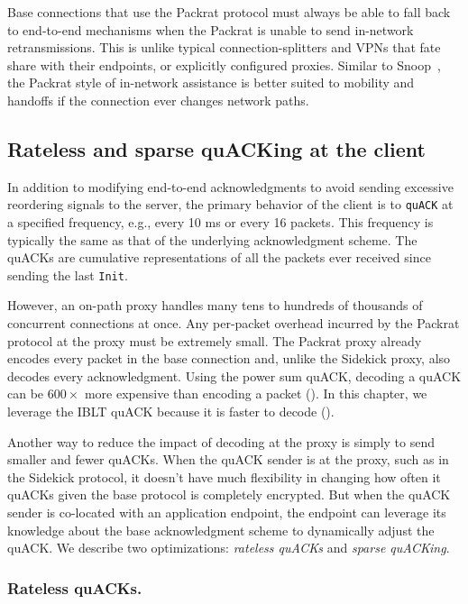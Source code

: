 Base connections that use the Packrat protocol must always be able to fall back to
end-to-end mechanisms when the Packrat is unable to send in-network
retransmissions. This is unlike typical connection-splitters and VPNs that fate
share with their endpoints, or explicitly configured proxies. Similar to
Snoop~\cite{balakrishnan1995snoop}, the Packrat style of in-network
assistance is better suited to mobility and handoffs if the connection ever
changes network paths.

\subsection{Rateless and sparse quACKing at the client}
\label{sec:packrat:design:client}

In addition to modifying end-to-end acknowledgments to avoid sending excessive
reordering signals to the server, the primary behavior of the client is
to \texttt{quACK} at a specified frequency, e.g., every 10 ms or every 16
packets. This frequency is typically the same as that of the underlying
acknowledgment scheme. The quACKs are cumulative representations of all the
packets ever received since sending the last \texttt{Init}.

However, an on-path proxy handles many tens to hundreds of thousands of
concurrent connections at once. Any per-packet overhead incurred by the Packrat
protocol at the proxy must be extremely small. The Packrat proxy already encodes
every packet in the base connection and, unlike the Sidekick proxy, also decodes
every acknowledgment. Using the power sum quACK, decoding a quACK can be
$600\!\times$ more expensive than encoding a packet
(). In this chapter, we leverage the IBLT
quACK because it is faster to decode ().

Another way to reduce the impact of decoding at the proxy is simply to send
smaller and fewer quACKs. When the quACK sender is at the proxy, such as in the
Sidekick protocol, it doesn't have much flexibility in changing how often it
quACKs given the base protocol is completely encrypted. But when the quACK
sender is co-located with an application endpoint, the endpoint can leverage
its knowledge about the base acknowledgment scheme to dynamically adjust the
quACK. We describe two optimizations: \textit{rateless quACKs} and
\textit{sparse quACKing}.

\subsubsection{Rateless quACKs.}
\label{sec:packrat:receiver:rateless}

